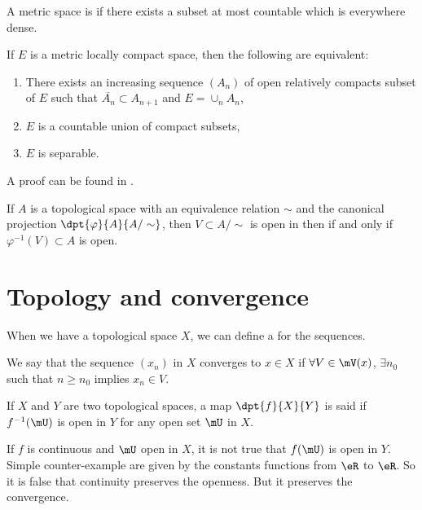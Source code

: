 \begin{definition}
A metric space is  if there exists a subset at most countable which is everywhere dense.
\end{definition}

\begin{proposition}
If $E$ is a metric locally compact space, then the following are equivalent:
\begin{enumerate}
\item There exists an increasing sequence $(A_n)$ of open relatively compacts subset of $E$ such that $\overline{A_n}\subset A_{n+1}$ and $E=\cup_n A_n$,

\item $E$ is a countable union of compact subsets,

\item $E$ is separable.
\end{enumerate}
\end{proposition}
A proof can be found in .

If $A$ is a topological space with an equivalence relation $\sim$ and the canonical projection $\dpt{\varphi}{A}{A/\sim}$, then $V\subset A/\sim$ is open in then  if and only if $\varphi^{-1}(V)\subset A$ is open. 

\section{Topology and convergence}

When we have a topological space $X$, we can define a  for the sequences.

\begin{definition}
We say that the sequence $(x_n)$ in $X$ converges to $x\in X$ if
$\forall V\in\mV(x)$, $\exists n_0$ such that $n\geq n_0$ implies $x_n\in V$. \label{def:convergence}
\end{definition}

\begin{definition}
If $X$ and $Y$ are two topological spaces, a map $\dpt{f}{X}{Y}$ is said  if $f^{-1}(\mU)$ is open in $Y$ for any open set $\mU$ in $X$.
\end{definition}

If $f$ is continuous and $\mU$ open in $X$, it is not true that $f(\mU)$ is open in $Y$. Simple counter-example are given by the constants functions from $\eR$ to $\eR$. So it is false that continuity preserves the openness. But it preserves the convergence. 

